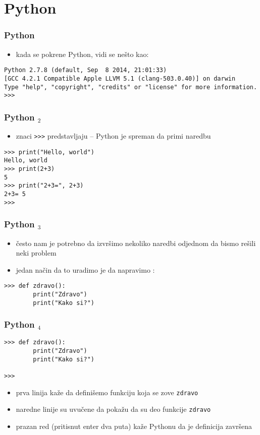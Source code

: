 \documentclass[utf8,compress]{beamer}
\begin{document}
\section{Python}

\begin{frame}[fragile,shrink=15]
\frametitle{Python}
\begin{itemize}
  \item kada se pokrene Python, vidi se nešto kao:
\end{itemize}
\begin{verbatim}
Python 2.7.8 (default, Sep  8 2014, 21:01:33) 
[GCC 4.2.1 Compatible Apple LLVM 5.1 (clang-503.0.40)] on darwin
Type "help", "copyright", "credits" or "license" for more information.
>>> 
\end{verbatim}
\end{frame}


\begin{frame}[fragile]
\frametitle{Python $_2$}
\begin{itemize}
  \item znaci \texttt{>}\texttt{>}\texttt{>} predstavljaju  -- Python je spreman da primi naredbu
\end{itemize}
\begin{verbatim}
>>> print("Hello, world")
Hello, world
>>> print(2+3)
5
>>> print("2+3=", 2+3)
2+3= 5
>>>
\end{verbatim}
\end{frame}

\begin{frame}[fragile]
\frametitle{Python $_3$}
\begin{itemize}
  \item često nam je potrebno da izvršimo nekoliko naredbi odjednom da bismo rešili neki problem
  \item jedan način da to uradimo je da napravimo :
\end{itemize}
\begin{verbatim}
>>> def zdravo():
        print("Zdravo")
        print("Kako si?")
\end{verbatim}
\end{frame}

\begin{frame}[fragile]
\frametitle{Python $_4$}
\begin{verbatim}
>>> def zdravo():
        print("Zdravo")
        print("Kako si?")
        
>>>
\end{verbatim}
\begin{itemize}
  \item prva linija kaže da definišemo funkciju koja se zove \texttt{zdravo}
  \item naredne linije su uvučene da pokažu da su deo funkcije \texttt{zdravo}
  \item prazan red (pritisnut enter dva puta) kaže Pythonu da je definicija završena
\end{itemize}
\end{frame}
\end{document}
